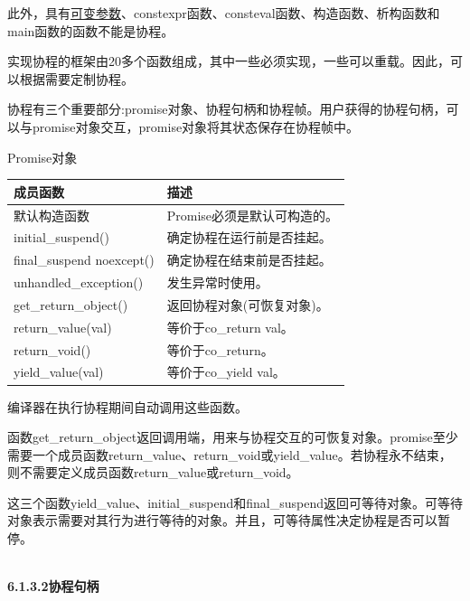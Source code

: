此外，具有\href{https://en.cppreference.com/w/cpp/language/variadic_arguments}{可变参数}、constexpr函数、consteval函数、构造函数、析构函数和main函数的函数不能是协程。


实现协程的框架由20多个函数组成，其中一些必须实现，一些可以重载。因此，可以根据需要定制协程。

协程有三个重要部分:promise对象、协程句柄和协程帧。用户获得的协程句柄，可以与promise对象交互，promise对象将其状态保存在协程帧中。

\begin{center}
Promise对象
\end{center}

\begin{table}[H]
\centering
\begin{tabular}{ll}
\textbf{成员函数}  & \textbf{描述}                                 \\ \hline
默认构造函数       & Promise必须是默认可构造的。             \\
initial\_suspend()        & 确定协程在运行前是否挂起。 \\
final\_suspend noexcept() & 确定协程在结束前是否挂起。 \\
unhandled\_exception()    & 发生异常时使用。                    \\
get\_return\_object()     & 返回协程对象(可恢复对象)。     \\
return\_value(val)        & 等价于co\_return val。                        \\
return\_void()            & 等价于co\_return。                            \\
yield\_value(val)         & 等价于co\_yield val。                        
\end{tabular}
\end{table}

编译器在执行协程期间自动调用这些函数。

函数get\_return\_object返回调用端，用来与协程交互的可恢复对象。promise至少需要一个成员函数return\_value、return\_void或yield\_value。若协程永不结束，则不需要定义成员函数return\_value或return\_void。

这三个函数yield\_value、initial\_suspend和final\_suspend返回可等待对象。可等待对象表示需要对其行为进行等待的对象。并且，可等待属性决定协程是否可以暂停。

\hspace*{\fill} \\ %
\noindent
\textbf{6.1.3.2\hspace{0.2cm}协程句柄}

